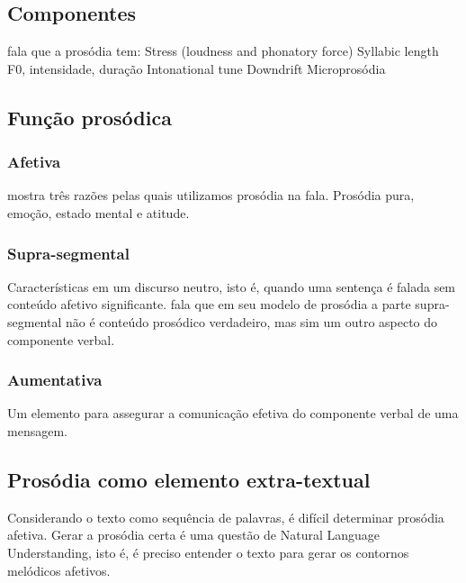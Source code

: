 \subsection{Componentes}
 fala que a prosódia tem:
Stress (loudness and phonatory force)
Syllabic length
F0, intensidade, duração
Intonational tune
Downdrift
Microprosódia
\subsection{Função prosódica}
\subsubsection{Afetiva}
 mostra três razões pelas quais utilizamos prosódia na fala.
Prosódia pura, emoção, estado mental e atitude. 
\subsubsection{Supra-segmental}
Características em um discurso neutro, isto é, quando uma sentença é falada sem
conteúdo afetivo significante.  fala que em seu modelo de
prosódia a parte supra-segmental não é conteúdo prosódico verdadeiro, mas sim
um outro aspecto do componente verbal.
\subsubsection{Aumentativa}
Um elemento para assegurar a comunicação efetiva do componente verbal de uma mensagem.
\subsection{Prosódia como elemento extra-textual}
Considerando o texto como sequência de palavras, é difícil determinar prosódia
afetiva.
Gerar a prosódia certa é uma questão de Natural Language Understanding, isto é,
é preciso entender o texto para gerar os contornos melódicos afetivos.


